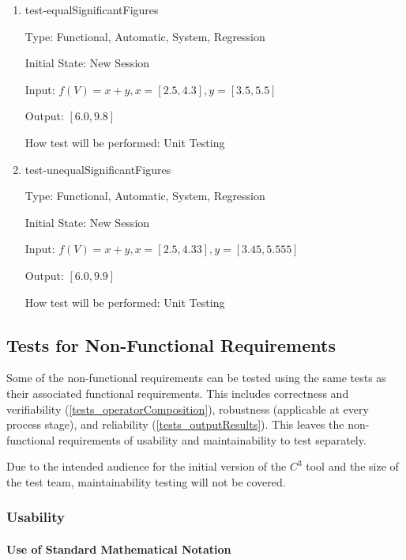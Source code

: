 \documentclass[12pt, titlepage]{article}
\newcommand{\prognameAbbrv}{$C^{3}$}
\begin{document}
\begin{enumerate}
	
	\item{test-equalSignificantFigures}
	
	Type: Functional, Automatic, System, Regression
	
	Initial State: New Session
	
	Input: $f(V) = x + y, x = [2.5,4.3], y = [3.5,5.5]$
	
	Output: $[6.0,9.8]$
	
	How test will be performed: Unit Testing\\
	
	\item{test-unequalSignificantFigures}
	
	Type: Functional, Automatic, System, Regression
	
	Initial State: New Session
	
	Input: $f(V) = x + y, x = [2.5,4.33], y = [3.45,5.555]$
	
	Output: $[6.0,9.9]$
	
	How test will be performed: Unit Testing\\
	
\end{enumerate}

\subsection{Tests for Non-Functional Requirements}
\label{testplan_nonfunctional}

Some of the non-functional requirements can be tested using the same tests as 
their associated functional requirements. This includes correctness 
and verifiability (\ref{tests_operatorComposition}), robustness (applicable at 
every process stage), and reliability (\ref{tests_outputResults}). This leaves 
the non-functional requirements of usability and maintainability to test 
separately. 

Due to the intended audience for the initial version of the \prognameAbbrv{} 
tool and the size of the test team, maintainability testing will not be covered.

\subsubsection{Usability}
\label{tests_nonfunctional_usability}
		
\paragraph{Use of Standard Mathematical Notation}
\end{document}
